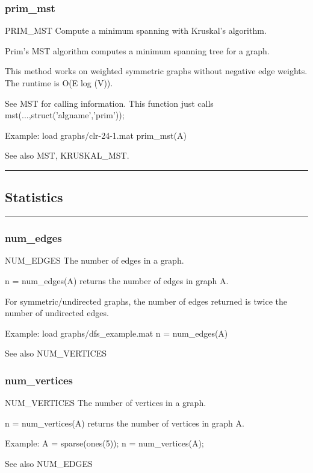 \subsubsection*{prim\_mst}
\begin{mcode}
  PRIM_MST Compute a minimum spanning with Kruskal's algorithm.
 
  Prim's MST algorithm computes a minimum spanning tree for a graph.
 
  This method works on weighted symmetric graphs without negative edge
  weights.
  The runtime is O(E log (V)).
 
  See MST for calling information.  This function just calls
  mst(...,struct('algname','prim'));
 
  Example:
     load graphs/clr-24-1.mat
     prim_mst(A)
 
  See also MST, KRUSKAL_MST.
\end{mcode}
\newpage
\hrule
\subsection*{Statistics}
\vspace{1cm}
\hrule
\subsubsection*{num\_edges}
\begin{mcode}
  NUM_EDGES The number of edges in a graph.
 
  n = num_edges(A) returns the number of edges in graph A.  
 
  For symmetric/undirected graphs, the number of edges returned is twice 
  the number of undirected edges.
 
  Example:
     load graphs/dfs_example.mat
     n = num_edges(A)
 
  See also NUM_VERTICES
\end{mcode}
\newpage
\subsubsection*{num\_vertices}
\begin{mcode}
  NUM_VERTICES The number of vertices in a graph.
 
  n = num_vertices(A) returns the number of vertices in graph A.  
 
  Example:
     A = sparse(ones(5));
     n = num_vertices(A);
 
  See also NUM_EDGES
\end{mcode}
\newpage
